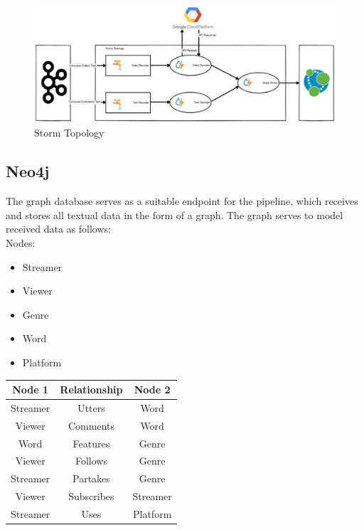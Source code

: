 \documentclass[10pt,conference]{IEEEtran}
\begin{document}
\begin{figure}[h]
  \includegraphics[width=\linewidth]{StormTopology.png}
  \caption                          {Storm Topology}
  \label                            {fig:StormTopology}
\end{figure}

\subsection{Neo4j}
The graph database serves as a suitable endpoint for the pipeline, which receives and stores all textual data in the form of a graph. The graph serves to model received data as follows: \\
Nodes:
\begin{itemize}
    \item Streamer
    \item Viewer
    \item Genre
    \item Word
    \item Platform
\end{itemize}

\begin{table}[h]
    \centering
    \begin{tabular}{|c|c|c|}
        \hline
        \textbf{Node 1}&\textbf{Relationship}&\textbf{Node 2}   \\ \hline
        Streamer&Utters&Word                                    \\ \hline
        Viewer&Comments&Word                                    \\ \hline
        Word&Features&Genre                                     \\ \hline
        Viewer&Follows&Genre                                    \\ \hline
        Streamer&Partakes&Genre                                 \\ \hline
        Viewer&Subscribes&Streamer                              \\ \hline
        Streamer&Uses&Platform                                  \\ \hline
    \end{tabular}
    \label{tab:GraphRelationships}
\end{table}
\end{document}
